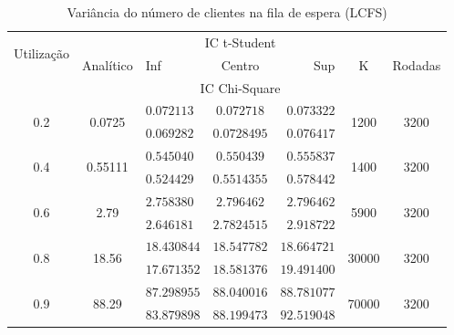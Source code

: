 \documentclass[a4paper]{article}
\begin{document}
\begin{table}[h!]
    \centering
    \begin{tabular}{|c|c|lcr|c|c|}\hline
        \multirow{2}{4.35em}{Utilização}
            & \multirow{3}{3.95em}{Analítico}
            & \multicolumn{3}{|c|}{IC t-Student}
            & \multirow{3}{1em}{K}
            & \multirow{3}{3.75em}{Rodadas} \\
        && Inf & Centro & Sup &&\\
        && \multicolumn{3}{|c|}{IC Chi-Square} &&\\\hline
        \multirow{2}{2em}{0.2}
            &\multirow{2}{3em}{0.0725}
            &$ 0.072113 $&$ 0.072718 $&$ 0.073322 $
            &\multirow{2}{2em}{1200} & \multirow{2}{2em}{3200}\\
            &&$ 0.069282 $&$ 0.0728495 $&$ 0.076417 $&&\\\hline
        \multirow{2}{2em}{0.4}
            &\multirow{2}{3em}{0.55111}
            &$ 0.545040 $&$ 0.550439 $&$ 0.555837 $
            &\multirow{2}{2em}{1400} & \multirow{2}{2em}{3200}\\
            &&$ 0.524429 $&$ 0.5514355 $&$ 0.578442 $&&\\\hline
        \multirow{2}{2em}{0.6}
            &\multirow{2}{2em}{2.79}
            &$ 2.758380 $&$ 2.796462 $&$ 2.796462 $
            &\multirow{2}{2em}{5900} & \multirow{2}{2em}{3200}\\
            &&$ 2.646181 $&$ 2.7824515 $&$ 2.918722 $&&\\\hline
        \multirow{2}{2em}{0.8}
            &\multirow{2}{2em}{18.56}
            &$ 18.430844 $&$ 18.547782 $&$ 18.664721 $
            &\multirow{2}{2em}{30000} & \multirow{2}{2em}{3200}\\
            &&$ 17.671352 $&$ 18.581376 $&$ 19.491400 $&&\\\hline
        \multirow{2}{2em}{0.9}
            &\multirow{2}{2em}{88.29}
            &$ 87.298955 $&$ 88.040016 $&$ 88.781077 $
            &\multirow{2}{2.5em}{70000} & \multirow{2}{2em}{3200}\\
            &&$ 83.879898 $&$ 88.199473 $&$ 92.519048 $&&\\\hline
    \end{tabular}
    \caption{Variância do número de clientes
    na fila de espera (LCFS)}
\end{table}
\end{document}
